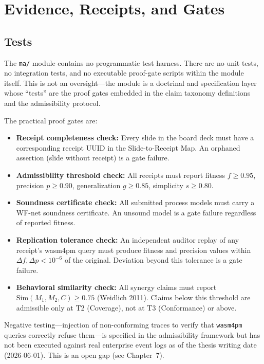 
\section{Evidence, Receipts, and Gates}
\label{sec:ma-evidence}

\subsection{Tests}
\label{sec:ma-evidence-tests}

The \texttt{ma/} module contains no programmatic test harness. There are no unit tests, no
integration tests, and no executable proof-gate scripts within the module itself. This is not
an oversight---the module is a doctrinal and specification layer whose ``tests'' are the
proof gates embedded in the claim taxonomy definitions and the admissibility protocol.

The practical proof gates are:

\begin{itemize}
  \item \textbf{Receipt completeness check:} Every slide in the board deck must have a
    corresponding receipt UUID in the Slide-to-Receipt Map. An orphaned assertion (slide
    without receipt) is a gate failure.
  \item \textbf{Admissibility threshold check:} All receipts must report fitness $f \ge 0.95$,
    precision $p \ge 0.90$, generalization $g \ge 0.85$, simplicity $s \ge 0.80$.
  \item \textbf{Soundness certificate check:} All submitted process models must carry a
    WF-net soundness certificate. An unsound model is a gate failure regardless of reported
    fitness.
  \item \textbf{Replication tolerance check:} An independent auditor replay of any receipt's
    wasm4pm query must produce fitness and precision values within $\Delta f, \Delta p <
    10^{-6}$ of the original. Deviation beyond this tolerance is a gate failure.
  \item \textbf{Behavioral similarity check:} All synergy claims must report
    $\text{Sim}(M_1, M_2, C) \ge 0.75$ (Weidlich 2011). Claims below this threshold are
    admissible only at T2 (Coverage), not at T3 (Conformance) or above.
\end{itemize}

Negative testing---injection of non-conforming traces to verify that \texttt{wasm4pm} queries
correctly refuse them---is specified in the admissibility framework but has not been executed
against real enterprise event logs as of the thesis writing date (2026-06-01). This is an open
gap (see Chapter~7).

